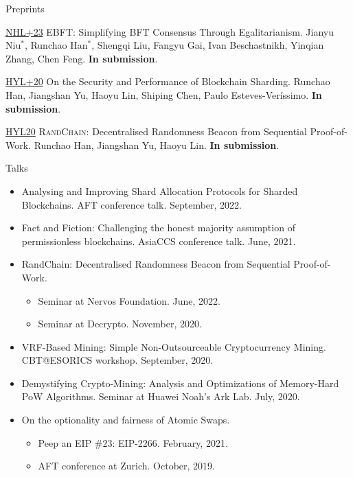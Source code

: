 \documentclass{resume} %
\begin{document}
\begin{rSection}{Preprints}
    \item[\href{https://arxiv.org/abs/2012.01636}{NHL+23}] EBFT: Simplifying BFT Consensus Through Egalitarianism. Jianyu Niu$^*$, Runchao Han$^*$, Shengqi Liu, Fangyu Gai, Ivan Beschastnikh, Yinqian Zhang, Chen Feng. \textbf{In submission}.
    \item[\href{https://eprint.iacr.org/2020/1033}{HYL+20}] On the Security and Performance of Blockchain Sharding. Runchao Han, Jiangshan Yu, Haoyu Lin, Shiping Chen, Paulo Esteves-Veríssimo. \textbf{In submission}.
    \item[\href{https://eprint.iacr.org/2020/1033}{HYL20}] \textsc{RandChain}: Decentralised Randomness Beacon from Sequential Proof-of-Work. Runchao Han, Jiangshan Yu, Haoyu Lin. \textbf{In submission}.
\end{rSection}

\begin{rSection}{Talks}
    \begin{itemize}
        \item Analysing and Improving Shard Allocation Protocols for Sharded Blockchains. AFT conference talk. September, 2022.
        \item Fact and Fiction: Challenging the honest majority assumption of permissionless blockchains. AsiaCCS conference talk. June, 2021.
        \item RandChain: Decentralised Randomness Beacon from Sequential Proof-of-Work.
              \begin{itemize}
                  \item Seminar at Nervos Foundation. June, 2022.
                  \item Seminar at Decrypto. November, 2020.
              \end{itemize}
        \item VRF-Based Mining: Simple Non-Outsourceable Cryptocurrency Mining. CBT@ESORICS workshop. September, 2020.
        \item Demystifying Crypto-Mining: Analysis and Optimizations of Memory-Hard PoW Algorithms. Seminar at Huawei Noah's Ark Lab. July, 2020.
        \item On the optionality and fairness of Atomic Swaps.
              \begin{itemize}
                  \item Peep an EIP \#23: EIP-2266. February, 2021.
                  \item AFT conference at Zurich. October, 2019.
              \end{itemize}
    \end{itemize}
\end{rSection}
\end{document}
